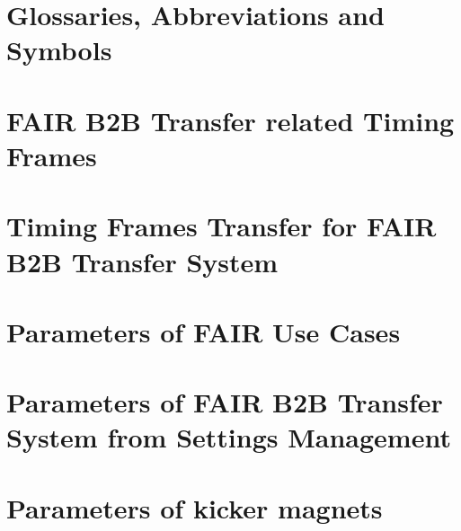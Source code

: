 \documentclass[12pt,twoside]{report}
\begin{document}
%
\appendix
\chapter{Glossaries, Abbreviations and Symbols}
\printnoidxglossary

\printnoidxglossary[type=abbreslist,style=long]
\printnoidxglossary[type=symbolslist,style=long]

\chapter{FAIR B2B Transfer related Timing Frames}

\chapter{Timing Frames Transfer for FAIR B2B Transfer System}

\chapter{Parameters of FAIR Use Cases}

\chapter{Parameters of FAIR B2B Transfer System from Settings Management}

\chapter{Parameters of kicker magnets}







\cleardoublepage
{}
\listoffigures %
\cleardoublepage
{}
\listoftables %



\renewcommand\chaptername{Publications}
\pagestyle{empty}


\renewcommand\chaptername{}
\pagestyle{empty}

%
\end{document}
